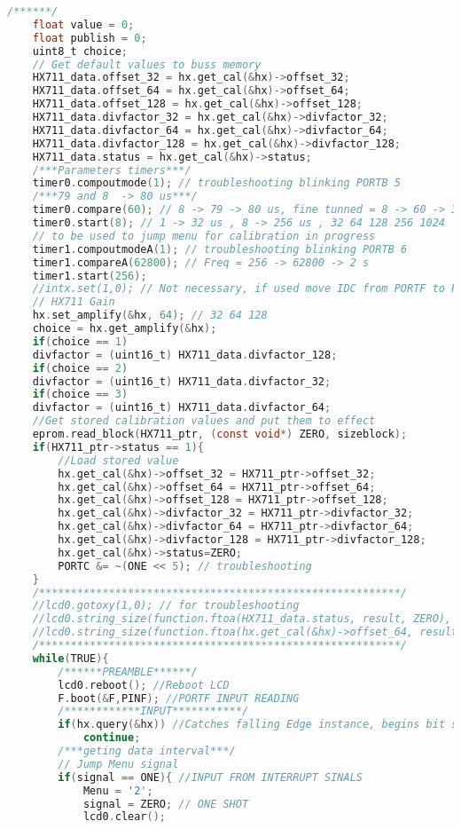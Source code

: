\begin{lstlisting}[language=C, caption={main.c}, label=main-c, captionpos=b]
	/******/
	float value = 0;
	float publish = 0;
	uint8_t choice;
	// Get default values to buss memory
	HX711_data.offset_32 = hx.get_cal(&hx)->offset_32;
	HX711_data.offset_64 = hx.get_cal(&hx)->offset_64;
	HX711_data.offset_128 = hx.get_cal(&hx)->offset_128;
	HX711_data.divfactor_32 = hx.get_cal(&hx)->divfactor_32;
	HX711_data.divfactor_64 = hx.get_cal(&hx)->divfactor_64;
	HX711_data.divfactor_128 = hx.get_cal(&hx)->divfactor_128;
	HX711_data.status = hx.get_cal(&hx)->status;
	/***Parameters timers***/
	timer0.compoutmode(1); // troubleshooting blinking PORTB 5
	/***79 and 8  -> 80 us***/
	timer0.compare(60); // 8 -> 79 -> 80 us, fine tunned = 8 -> 60 -> 30.4us
	timer0.start(8); // 1 -> 32 us , 8 -> 256 us , 32 64 128 256 1024
	// to be used to jump menu for calibration in progress
	timer1.compoutmodeA(1); // troubleshooting blinking PORTB 6
	timer1.compareA(62800); // Freq = 256 -> 62800 -> 2 s
	timer1.start(256);
	//intx.set(1,0); // Not necessary, if used move IDC from PORTF to PORTD with new config pinage.
	// HX711 Gain
	hx.set_amplify(&hx, 64); // 32 64 128
	choice = hx.get_amplify(&hx);
	if(choice == 1)
	divfactor = (uint16_t) HX711_data.divfactor_128;
	if(choice == 2)
	divfactor = (uint16_t) HX711_data.divfactor_32;
	if(choice == 3)
	divfactor = (uint16_t) HX711_data.divfactor_64;
	//Get stored calibration values and put them to effect
	eprom.read_block(HX711_ptr, (const void*) ZERO, sizeblock);
	if(HX711_ptr->status == 1){
		//Load stored value 
		hx.get_cal(&hx)->offset_32 = HX711_ptr->offset_32;
		hx.get_cal(&hx)->offset_64 = HX711_ptr->offset_64;
		hx.get_cal(&hx)->offset_128 = HX711_ptr->offset_128;
		hx.get_cal(&hx)->divfactor_32 = HX711_ptr->divfactor_32;
		hx.get_cal(&hx)->divfactor_64 = HX711_ptr->divfactor_64;
		hx.get_cal(&hx)->divfactor_128 = HX711_ptr->divfactor_128;
		hx.get_cal(&hx)->status=ZERO;
		PORTC &= ~(ONE << 5); // troubleshooting
	}
	/*********************************************************/
	//lcd0.gotoxy(1,0); // for troubleshooting
	//lcd0.string_size(function.ftoa(HX711_data.status, result, ZERO), 13);
	//lcd0.string_size(function.ftoa(hx.get_cal(&hx)->offset_64, result, ZERO), 13);
	/*********************************************************/
	while(TRUE){
		/******PREAMBLE******/
		lcd0.reboot(); //Reboot LCD
		F.boot(&F,PINF); //PORTF INPUT READING
		/************INPUT***********/
		if(hx.query(&hx)) //Catches falling Edge instance, begins bit shifting.
			continue;
		/***geting data interval***/
		// Jump Menu signal
		if(signal == ONE){ //INPUT FROM INTERRUPT SINALS
			Menu = '2';
			signal = ZERO; // ONE SHOT
			lcd0.clear();

\end{lstlisting}
